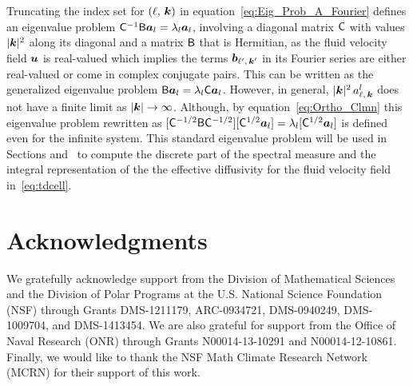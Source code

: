 \documentclass[amsa]{ipart}
\begin{document}
Truncating the index set for $(\ell,\,\boldsymbol{k})$
in equation~\eqref{eq:Eig_Prob_A_Fourier} defines an eigenvalue problem
$\mathsf{C}^{-1}\mathsf{B}\boldsymbol{a}_l=\lambda_l\boldsymbol{a}_l$, involving a diagonal matrix $\mathsf{C}$
with values $|\boldsymbol{k}|^2$ along its diagonal and a matrix $\mathsf{B}$ that is
Hermitian, as the fluid velocity field $\boldsymbol{u}$ is real-valued which 
implies the terms $\boldsymbol{b}_{\ell^\prime,\,\boldsymbol{k}^\prime}$ in its Fourier series are
either real-valued or 
come in complex conjugate pairs. This can be written as the generalized
eigenvalue problem $\mathsf{B}\boldsymbol{a}_l=\lambda_l\mathsf{C}\boldsymbol{a}_l$. However, in general,
$|\boldsymbol{k}|^2\,a^l_{\ell,\,\boldsymbol{k}}$ does not have a finite 
limit as $|\boldsymbol{k}|\to\infty$. Although, by equation~\eqref{eq:Ortho_Clmn}
this eigenvalue problem rewritten as
$[\mathsf{C}^{-1/2}\mathsf{B}\mathsf{C}^{-1/2}][\mathsf{C}^{1/2}\boldsymbol{a}_l]=\lambda_l[\mathsf{C}^{1/2}\boldsymbol{a}_l]$ is
defined even for the infinite system. This standard eigenvalue problem
will be     
used in Sections 
and~ to compute the discrete part of the  
spectral measure and the integral representation of the the effective
diffusivity for the fluid velocity field in~\eqref{eq:tdcell}. 












\medskip

\section*{Acknowledgments}
We gratefully acknowledge support from the Division of Mathematical
  Sciences and the Division of Polar Programs at the U.S. National
  Science Foundation (NSF) through Grants DMS-1211179, 
  ARC-0934721, DMS-0940249, DMS-1009704, and DMS-1413454. 
  We are also grateful for support from
  the Office of Naval Research (ONR) through Grants N00014-13-10291 and
  N00014-12-10861. Finally, we would like to thank the NSF Math Climate
  Research Network (MCRN) for their support of this work. 

\medskip




%


\end{document}

